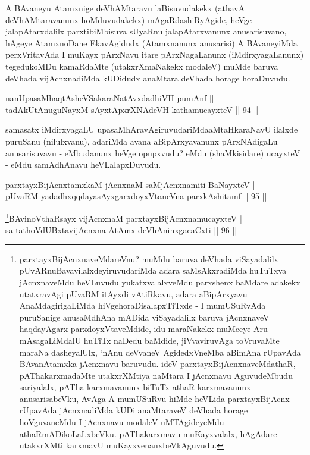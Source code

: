 \begin{artha}
A BAvaneyu Atamxnige deVhAMtaravu laBisuvudakekx (athavA
deVhAMtaravanunx hoMduvudakekx) mAgaRdashiRyAgide, heVge
jalapAtarxdalilx parxtibiMbisuva sUyaRnu jalapAtarxvanunx
anusarisu\-\break vano, hAgeye AtamxnoDane EkavAgidudx (Atamxnanunx anusarisi)
A BAvaneyiMda perxVritavAda I muKayx pArxNavu itare pArxNagaLanunx
(iMdirxyagaLanunx) tegedukoMDu kamaRdaMte (utakxrXmaNakekx modaleV)
muMde baruva deVhada vijAcnxnadiMda kUDidudx anaMtara deVhada horage
horaDuvudu.
\end{artha}

\begin{shl}
nanUpasaMhaqtAsheVSakaraNatAvxdadhiVH pumAnf || \\
tadAkUtAnuguNayxM sAyxtApxrXNAdeVH kathamucayxteV \hfill || 94 ||  
\end{shl}

\begin{artha}
samasatx iMdirxyagaLU upasaMhAravAgiruvudariMda\break aMtaHkaraNavU ilalxde
puruSanu (nilulxvanu), adariMda avana aBipArxyavanunx pArxNAdigaLu
anusarisuvavu - eMbudanunx heVge opupxvudu? eMdu (shaMkisidare)
ucayxteV - eMdu samAdhAnavu heVLalapxDuvudu.
\end{artha}


\begin{shl}
parxtayxBijAcnxtamxkaM jAcnxnaM saMjAcnxnamiti BaNayxteV || \\
pUvaRM yadadhxqqdayasAyxgarxdoyxVtaneVna parxkAshitamf \hfill || 95 ||  
\end{shl}

\begin{shl}
\footnote{parxtayxBijAcnxnaveMdareVnu? muMdu baruva deVhada viSayadalilx pUvARnuBavavilalxdeyiruvudariMda adara saMsAkxradiMda huTuTxva jAcnxnaveMdu heVLuvudu yukatxvalalxveMdu parxshenx baMdare adakekx utatxravAgi pUvaRM itAyxdi vAtiRkavu, adara aBipArxyavu AnaMdagirigaLiMda hiVge\break horaDisalapxTiTxde - I mumUSuRvAda puruSanige anusaMdhAna mADida viSayadalilx baruva jAcnxnaveV haqdayAgarx parxdoyxVtaveMdide, idu maraNakekx muMceye Aru mAsagaLiMdalU huTiTx naDedu baMdide, jiVvaviruvAga toVruvaMte maraNa dasheyalUlx, `nAnu deVvaneV AgidedxVneMba aBimAna rUpavAda BAvanAtamxka jAcnxnavu baruvudu. ideV parxtayxBijAcnxnaveMdathaR, pAThakarxmadaMte utakxrXMtiya naMtara I jAcnxnavu AguvudeMbudu sariyalalx, pATha karxmavanunx biTuTx athaR karxmavanunx anusarisabeVku, AvAga A mumUSuRvu hiMde heVLida parxtayxBijAcnx rUpavAda jAcnxnadiMda kUDi anaMtaraveV deVhada horage hoVguvaneMdu I jAcnxnavu modaleV uMTAgideyeMdu athaRmADikoLaLxbeVku. pAThakarxmavu muKayxvalalx, hAgAdare utakxrXMti karxmavU muKayxvenanxbeVkAguvudu.}BAvinoV\s thaRsayx vijAcnxnaM parxtayxBijAcnxnamucayxteV ||  \\
sa tathoVdUBxtavijAcnxna AtAmx deVhAninxgacaCxti \hfill || 96 || 
\end{shl}



